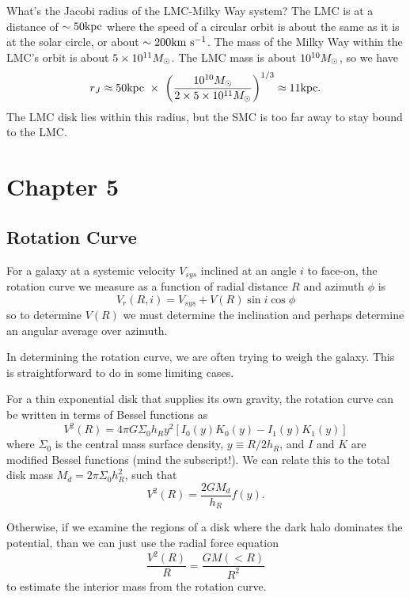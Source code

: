 \documentclass[]{article}
\begin{document}
What's the Jacobi radius of the LMC-Milky Way system? The LMC is at a distance of $\sim50\mathrm{kpc}$ where
the speed of a circular orbit is about the same as it is at the solar circle, or about $\sim200\mathrm{km}~\mathrm{s}^{-1}$.
The mass of the Milky Way within the LMC's orbit is about $5\times10^{11}M_{\odot}$.  The LMC mass is about
$10^{10}M_{\odot}$, so we have
\begin{equation}
r_J\approx 50\mathrm{kpc}~\times~\left(\frac{10^{10}M_{\odot}}{2\times5\times10^{11}M_{\odot}}\right)^{1/3} \approx 11\mathrm{kpc}.
\end{equation}
The LMC disk lies within this radius, but the SMC is too far away to stay bound to the LMC.


\section{Chapter 5}

\subsection{Rotation Curve}

For a galaxy at a systemic velocity $V_{sys}$ inclined at an angle $i$ to face-on, the rotation curve we measure as a function of radial distance $R$ and azimuth $\phi$ is
\begin{equation}
V_r(R,i) = V_{sys} + V(R)\sin i \cos \phi
\end{equation}
\noindent
so to determine $V(R)$ we must determine the inclination and perhaps determine an angular average over azimuth.

In determining the rotation curve, we are often trying to weigh the galaxy.  This is straightforward to do in
some limiting cases.

For a thin exponential disk that supplies its own gravity, the rotation curve can be written in terms of Bessel
functions as
\begin{equation}
V^2(R) = 4\pi G \Sigma_0 h_R y^2 [I_0(y) K_0(y) - I_1(y) K_1(y)]
\end{equation}
\noindent
where $\Sigma_0$ is the central mass surface density, $y\equiv R/2h_R$,
 and $I$ and $K$ are modified Bessel functions (mind the subscript!). We can
relate this to the total disk mass $M_d = 2\pi\Sigma_0 h_R^2$, such that
\begin{equation}
V^2(R) = \frac{2GM_d}{h_R}f(y).
\end{equation}

Otherwise, if we examine the regions of a disk where the dark halo dominates the potential, than we can just use
the radial force equation
\begin{equation}
\frac{V^2(R)}{R} = \frac{GM(<R)}{R^2}
\end{equation}
\noindent 
to estimate the interior mass from the rotation curve.
\end{document}
